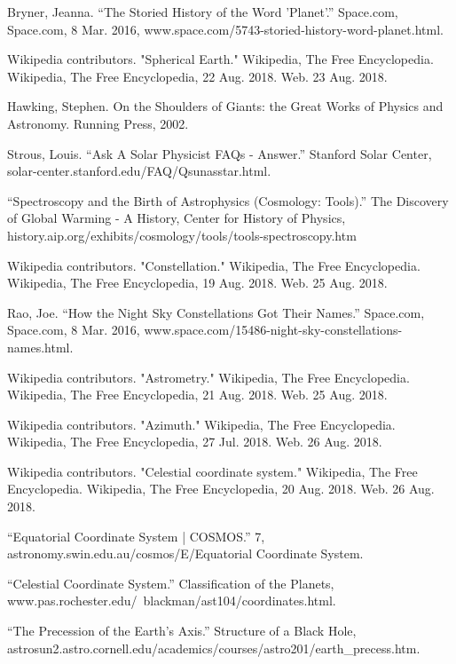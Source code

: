\documentclass[a4paper,twoside,11pt]{article}
\numberwithin{equation}{section}
\begin{document}
\begin{thebibliography}{300}
Bryner, Jeanna. “The Storied History of the Word 'Planet'.” Space.com, Space.com, 8 Mar. 2016, www.space.com/5743-storied-history-word-planet.html.

Wikipedia contributors. "Spherical Earth." Wikipedia, The Free Encyclopedia. Wikipedia, The Free Encyclopedia, 22 Aug. 2018. Web. 23 Aug. 2018.

Hawking, Stephen. On the Shoulders of Giants: the Great Works of Physics and Astronomy. Running Press, 2002.

Strous, Louis. “Ask A Solar Physicist FAQs - Answer.” Stanford Solar Center, solar-center.stanford.edu/FAQ/Qsunasstar.html.

“Spectroscopy and the Birth of Astrophysics (Cosmology: Tools).” The Discovery of Global Warming - A History, Center for History of Physics, history.aip.org/exhibits/cosmology/tools/tools-spectroscopy.htm

Wikipedia contributors. "Constellation." Wikipedia, The Free Encyclopedia. Wikipedia, The Free Encyclopedia, 19 Aug. 2018. Web. 25 Aug. 2018.

Rao, Joe. “How the Night Sky Constellations Got Their Names.” Space.com, Space.com, 8 Mar. 2016, www.space.com/15486-night-sky-constellations-names.html.

Wikipedia contributors. "Astrometry." Wikipedia, The Free Encyclopedia. Wikipedia, The Free Encyclopedia, 21 Aug. 2018. Web. 25 Aug. 2018.

Wikipedia contributors. "Azimuth." Wikipedia, The Free Encyclopedia. Wikipedia, The Free Encyclopedia, 27 Jul. 2018. Web. 26 Aug. 2018.

Wikipedia contributors. "Celestial coordinate system." Wikipedia, The Free Encyclopedia. Wikipedia, The Free Encyclopedia, 20 Aug. 2018. Web. 26 Aug. 2018.

“Equatorial Coordinate System | COSMOS.” 7, astronomy.swin.edu.au/cosmos/E/Equatorial Coordinate System.

“Celestial Coordinate System.” Classification of the Planets, \\www.pas.rochester.edu/~blackman/ast104/coordinates.html.

“The Precession of the Earth's Axis.” Structure of a Black Hole, \\astrosun2.astro.cornell.edu/academics/courses/astro201/earth\_precess.htm.


\end{thebibliography}
\end{document}

